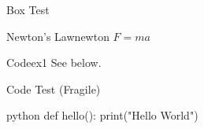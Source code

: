 \documentclass[theme=school, aspectratio=169, linecolor=black]{Hypo-Slide}
\begin{document}
\frame{\titlepage}

\begin{frame}{Box Test}
  \begin{definition}{Newton's Law}{newton}
    $F=ma$
  \end{definition}
  \begin{example}{Code}{ex1}
    See below.
  \end{example}
\end{frame}

\begin{frame}[fragile]{Code Test (Fragile)}
  \begin{hypocode}{python}
    def hello():
        print("Hello World")
  \end{hypocode}
\end{frame}
\end{document}
